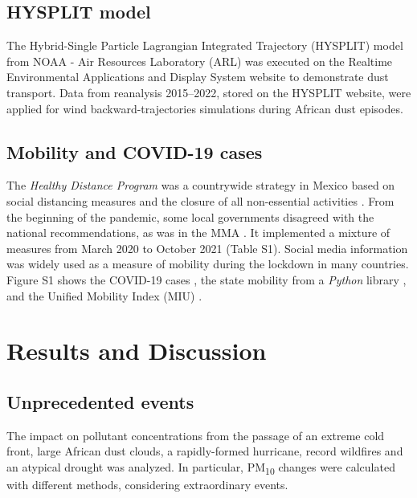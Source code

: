 \documentclass[preprint,12pt]{elsarticle}
\begin{document}
\subsection{HYSPLIT model}
The Hybrid-Single Particle Lagrangian Integrated Trajectory (HYSPLIT) model from NOAA - Air Resources Laboratory (ARL) \citep{Stein_2015} was executed on the Realtime Environmental Applications and Display System website to demonstrate dust transport. Data from reanalysis 2015–2022, stored on the HYSPLIT website, were applied for wind backward-trajectories simulations during African dust episodes.
\subsection{Mobility and COVID-19 cases}
The \emph{Healthy Distance Program} was a countrywide strategy in Mexico based on social distancing measures and the closure of all non-essential activities \citep{covid-19a}. From the beginning of the pandemic, some local governments disagreed with the national recommendations, as was in the MMA \citep{state}. It implemented a mixture of measures from March 2020 to October 2021 (Table S1). Social media information was widely used as a measure of mobility during the lockdown in many countries. Figure S1 shows the COVID-19 cases \citep{covid19mex}, the state mobility from a \emph{Python} library \citep{Graff_2022}, and the Unified Mobility Index (MIU) \citep{conacyt}.
\section{Results and Discussion}
\subsection{Unprecedented events}
The impact on pollutant concentrations from the passage of an extreme cold front, large African dust clouds, a rapidly-formed hurricane, record wildfires and an atypical drought was analyzed. In particular, PM\textsubscript{10} changes were calculated with different methods, considering extraordinary events.
\end{document}
